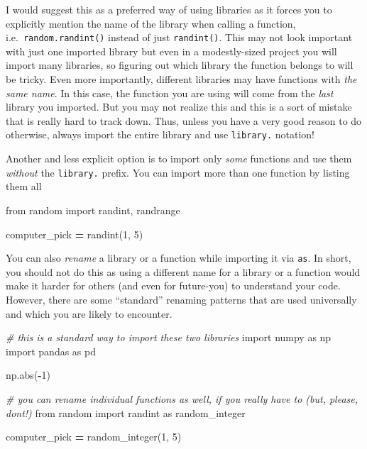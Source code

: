 \documentclass[
]{book}
\newenvironment{Shaded}{\begin{snugshade}}{\end{snugshade}}
\newcommand{\BuiltInTok}[1]{#1}
\newcommand{\CommentTok}[1]{\textcolor[rgb]{0.56,0.35,0.01}{\textit{#1}}}
\newcommand{\DecValTok}[1]{\textcolor[rgb]{0.00,0.00,0.81}{#1}}
\newcommand{\ImportTok}[1]{#1}
\newcommand{\NormalTok}[1]{#1}
\newcommand{\OperatorTok}[1]{\textcolor[rgb]{0.81,0.36,0.00}{\textbf{#1}}}
\begin{document}
I would suggest this as a preferred way of using libraries as it forces you to explicitly mention the name of the library when calling a function, i.e.~\texttt{random.randint()} instead of just \texttt{randint()}. This may not look important with just one imported library but even in a modestly-sized project you will import many libraries, so figuring out which library the function belongs to will be tricky. Even more importantly, different libraries may have functions with \emph{the same name}. In this case, the function you are using will come from the \emph{last} library you imported. But you may not realize this and this is a sort of mistake that is really hard to track down. Thus, unless you have a very good reason to do otherwise, always import the entire library and use \texttt{library.} notation!

Another and less explicit option is to import only \emph{some} functions and use them \emph{without} the \texttt{library.} prefix. You can import more than one function by listing them all

\begin{Shaded}
\begin{Highlighting}[]
\ImportTok{from}\NormalTok{ random }\ImportTok{import}\NormalTok{ randint, randrange}

\NormalTok{computer\_pick }\OperatorTok{=}\NormalTok{ randint(}\DecValTok{1}\NormalTok{, }\DecValTok{5}\NormalTok{)}
\end{Highlighting}
\end{Shaded}

You can also \emph{rename} a library or a function while importing it via \texttt{as}. In short, you should not do this as using a different name for a library or a function would make it harder for others (and even for future-you) to understand your code. However, there are some ``standard'' renaming patterns that are used universally and which you are likely to encounter.

\begin{Shaded}
\begin{Highlighting}[]
\CommentTok{\# this is a standard way to import these two libraries}
\ImportTok{import}\NormalTok{ numpy }\ImportTok{as}\NormalTok{ np}
\ImportTok{import}\NormalTok{ pandas }\ImportTok{as}\NormalTok{ pd}

\NormalTok{np.}\BuiltInTok{abs}\NormalTok{(}\OperatorTok{{-}}\DecValTok{1}\NormalTok{)}

\CommentTok{\# you can rename individual functions as well, if you really have to (but, please, don\textquotesingle{}t!)}
\ImportTok{from}\NormalTok{ random }\ImportTok{import}\NormalTok{ randint }\ImportTok{as}\NormalTok{ random\_integer}

\NormalTok{computer\_pick }\OperatorTok{=}\NormalTok{ random\_integer(}\DecValTok{1}\NormalTok{, }\DecValTok{5}\NormalTok{)}
\end{Highlighting}
\end{Shaded}
\end{document}
